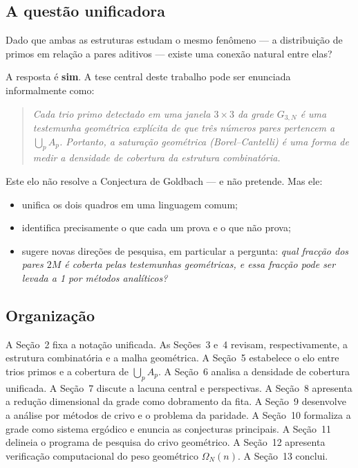 \documentclass[12pt,a4paper]{article}
\theoremstyle{remark}
\begin{document}
	\subsection*{A quest\~ao unificadora}
	
	Dado que ambas as estruturas estudam o mesmo fen\^omeno --- a distribui\c{c}\~ao de primos
	em rela\c{c}\~ao a pares aditivos --- existe uma conex\~ao natural entre elas?
	
	A resposta \'e \textbf{sim}. A tese central deste trabalho pode ser enunciada informalmente como:
	
	\begin{quote}
		\itshape
		Cada trio primo detectado em uma janela $3\times3$ da grade $G_{3,N}$
		\'e uma testemunha geom\'etrica expl\'icita de que tr\^es n\'umeros pares
		pertencem a $\bigcup_p A_p$. Portanto, a satura\c{c}\~ao geom\'etrica (Borel--Cantelli)
		\'e uma forma de medir a \emph{densidade de cobertura} da estrutura combinat\'oria.
	\end{quote}
	
	Este elo n\~ao resolve a Conjectura de Goldbach --- e n\~ao pretende. Mas ele:
	\begin{itemize}
		\item unifica os dois quadros em uma linguagem comum;
		\item identifica precisamente o que cada um prova e o que n\~ao prova;
		\item sugere novas dire\c{c}\~oes de pesquisa, em particular a pergunta:
		\emph{qual frac\c{c}\~ao dos pares $2M$ \'e coberta pelas testemunhas
			geom\'etricas, e essa frac\c{c}\~ao pode ser levada a 1 por m\'etodos anal\'iticos?}
	\end{itemize}
	
	\subsection*{Organiza\c{c}\~ao}
	
	A Se\c{c}\~ao~2 fixa a nota\c{c}\~ao unificada.
	As Se\c{c}\~oes~3 e~4 revisam, respectivamente, a estrutura combinat\'oria e a malha geom\'etrica.
	A Se\c{c}\~ao~5 estabelece o elo entre trios primos e a cobertura de $\bigcup_p A_p$.
	A Se\c{c}\~ao~6 analisa a densidade de cobertura unificada.
	A Se\c{c}\~ao~7 discute a lacuna central e perspectivas.
	A Se\c{c}\~ao~8 apresenta a redu\c{c}\~ao dimensional da grade como dobramento da fita.
	A Se\c{c}\~ao~9 desenvolve a an\'alise por m\'etodos de crivo e o problema da paridade.
	A Se\c{c}\~ao~10 formaliza a grade como sistema erg\'odico e enuncia as conjecturas principais.
	A Se\c{c}\~ao~11 delineia o programa de pesquisa do crivo geom\'etrico.
	A Se\c{c}\~ao~12 apresenta verifica\c{c}\~ao computacional do peso geom\'etrico $\Omega_N(n)$.
	A Se\c{c}\~ao~13 conclui.
	
\end{document}
